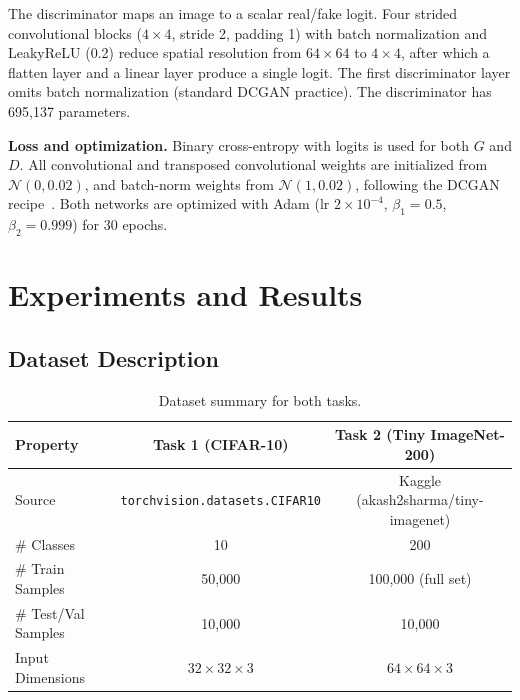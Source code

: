\documentclass[12pt]{article}
\begin{document}
The discriminator maps an image to a scalar real/fake logit. Four strided convolutional blocks ($4\times4$, stride 2, padding 1) with batch normalization and LeakyReLU (0.2) reduce spatial resolution from $64\times64$ to $4\times4$, after which a flatten layer and a linear layer produce a single logit. The first discriminator layer omits batch normalization (standard DCGAN practice). The discriminator has 695,137 parameters.

\textbf{Loss and optimization.} Binary cross-entropy with logits is used for both $G$ and $D$. All convolutional and transposed convolutional weights are initialized from $\mathcal{N}(0, 0.02)$, and batch-norm weights from $\mathcal{N}(1, 0.02)$, following the DCGAN recipe~\cite{dcgan2015}. Both networks are optimized with Adam (lr $2\times10^{-4}$, $\beta_1=0.5$, $\beta_2=0.999$) for 30 epochs.

\section{Experiments and Results}

\subsection{Dataset Description}

\begin{table}[h]
    \centering
    \caption{Dataset summary for both tasks.}
    \begin{tabular}{lcc}
        \toprule
        \textbf{Property} & \textbf{Task 1 (CIFAR-10)} & \textbf{Task 2 (Tiny ImageNet-200)} \\
        \midrule
        Source        & \texttt{torchvision.datasets.CIFAR10} & Kaggle (akash2sharma/tiny-imagenet) \\
        \# Classes    & 10   & 200 \\
        \# Train Samples & 50,000 & 100,000 (full set) \\
        \# Test/Val Samples & 10,000 & 10,000 \\
        Input Dimensions & $32 \times 32 \times 3$ & $64 \times 64 \times 3$ \\
        \bottomrule
    \end{tabular}
    \label{tab:datasets}
\end{table}
\end{document}

